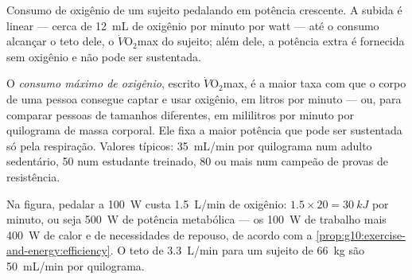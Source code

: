 \begin{omfigure}

{\small Consumo de oxigênio de um sujeito pedalando em potência
crescente. A subida é linear --- cerca de \qty{12}{mL} de oxigênio por
minuto por watt --- até o consumo alcançar o teto dele, o
$\dot V\!\mathrm{O_2}$max do sujeito; além dele, a potência extra é
fornecida sem oxigênio e não pode ser sustentada.}
\end{omfigure}

\begin{definition}\label{def:g10:exercise-and-energy:vo2max}
O \emph{consumo máximo de oxigênio},
escrito $\dot V\!\mathrm{O_2}$max, é a maior taxa com que o corpo de
uma pessoa consegue captar e usar oxigênio, em litros por minuto ---
ou, para comparar pessoas de tamanhos diferentes, em mililitros por
minuto por quilograma de massa corporal. Ele fixa a maior potência que
pode ser sustentada só pela respiração. Valores típicos:
\qty{35}{mL/min} por quilograma num adulto sedentário, \num{50} num
estudante treinado, \num{80} ou mais num campeão de provas de
resistência.
\end{definition}

\begin{example}\label{ex:g10:exercise-and-energy:reading}
Na figura, pedalar a \qty{100}{W} custa \qty{1.5}{L/min} de oxigênio:
$1.5 \times 20 = \qty{30}{kJ}$ por minuto, ou seja \qty{500}{W} de
potência metabólica --- os \qty{100}{W} de trabalho mais \qty{400}{W} de
calor e de necessidades de repouso, de acordo com a
\cref{prop:g10:exercise-and-energy:efficiency}. O teto de
\qty{3.3}{L/min} para um sujeito de \qty{66}{kg} são \qty{50}{mL/min}
por quilograma.
\end{example}

